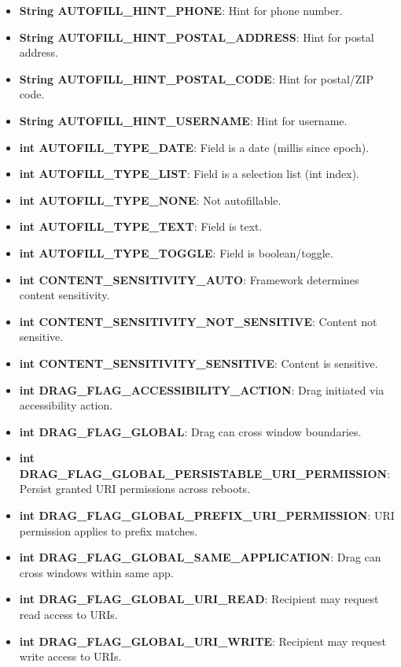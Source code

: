 \documentclass{report}
\begin{document}
\begin{itemize}
\begin{itemize}
                \item \textbf{String AUTOFILL\_HINT\_PHONE}: Hint for phone number.
                \item \textbf{String AUTOFILL\_HINT\_POSTAL\_ADDRESS}: Hint for postal address.
                \item \textbf{String AUTOFILL\_HINT\_POSTAL\_CODE}: Hint for postal/ZIP code.
                \item \textbf{String AUTOFILL\_HINT\_USERNAME}: Hint for username.
                \item \textbf{int AUTOFILL\_TYPE\_DATE}: Field is a date (millis since epoch).
                \item \textbf{int AUTOFILL\_TYPE\_LIST}: Field is a selection list (int index).
                \item \textbf{int AUTOFILL\_TYPE\_NONE}: Not autofillable.
                \item \textbf{int AUTOFILL\_TYPE\_TEXT}: Field is text.
                \item \textbf{int AUTOFILL\_TYPE\_TOGGLE}: Field is boolean/toggle.
                \item \textbf{int CONTENT\_SENSITIVITY\_AUTO}: Framework determines content sensitivity.
                \item \textbf{int CONTENT\_SENSITIVITY\_NOT\_SENSITIVE}: Content not sensitive.
                \item \textbf{int CONTENT\_SENSITIVITY\_SENSITIVE}: Content is sensitive.
                \item \textbf{int DRAG\_FLAG\_ACCESSIBILITY\_ACTION}: Drag initiated via accessibility action.
                \item \textbf{int DRAG\_FLAG\_GLOBAL}: Drag can cross window boundaries.
                \item \textbf{int DRAG\_FLAG\_GLOBAL\_PERSISTABLE\_URI\_PERMISSION}: Persist granted URI permissions across reboots.
                \item \textbf{int DRAG\_FLAG\_GLOBAL\_PREFIX\_URI\_PERMISSION}: URI permission applies to prefix matches.
                \item \textbf{int DRAG\_FLAG\_GLOBAL\_SAME\_APPLICATION}: Drag can cross windows within same app.
                \item \textbf{int DRAG\_FLAG\_GLOBAL\_URI\_READ}: Recipient may request read access to URIs.
                \item \textbf{int DRAG\_FLAG\_GLOBAL\_URI\_WRITE}: Recipient may request write access to URIs.

\end{itemize}
\end{itemize}
\end{document}
